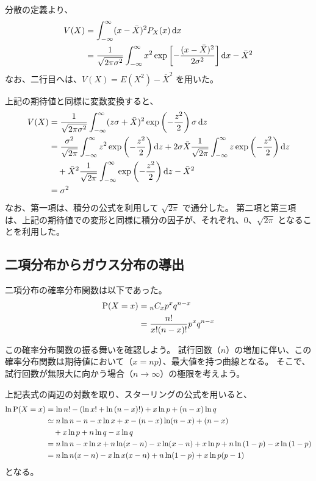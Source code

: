 \documentclass[a4paper,11pt]{ltjsarticle}
\begin{document}
\begin{appendix}
分散の定義より、
\begin{align}
V(X) 
	&= \int_{-\infty}^{\infty} (x - \bar{X})^2 P_X(x) \odif{x} \notag \\
	&= \frac{1}{\sqrt{2 \pi \sigma^2}} \int_{-\infty}^{\infty} x^2 \exp \left[- \frac{(x -\bar{X})^2}{2 \sigma^2} \right] \odif{x} - \bar{X}^2
\end{align}
なお、二行目へは、$V(X)=E(X^2)-\bar{X}^2$ を用いた。

上記の期待値と同様に変数変換すると、
\begin{align}
V(X) 
	&= \frac{1}{\sqrt{2 \pi \sigma^2}}  \int_{-\infty}^{\infty} (z\sigma + \bar{X})^2 \exp \left(- \frac{z^2}{2} \right) \sigma \odif{z} \notag \\
	&= \frac{\sigma^2}{\sqrt{2 \pi}}  \int_{-\infty}^{\infty} z^2 \exp \left(- \frac{z^2}{2} \right) \odif{z} + 2\sigma \bar{X} \frac{1}{\sqrt{2 \pi}} \int_{-\infty}^{\infty} z \exp \left(- \frac{z^2}{2} \right) \odif{z} \notag \\
	&\quad + \bar{X}^2 \frac{1}{\sqrt{2 \pi}} \int_{-\infty}^{\infty} \exp \left(- \frac{z^2}{2} \right) \odif{z} - \bar{X}^2 \notag \\
	&= \sigma^2
\end{align}
なお、第一項は、積分の公式を利用して $\sqrt{2 \pi}$ で通分した。
第二項と第三項は、上記の期待値での変形と同様に積分の因子が、それぞれ、0、$\sqrt{2 \pi}$ となることを利用した。


\subsection{二項分布からガウス分布の導出}
二項分布の確率分布関数は以下であった。
\begin{align}
{\rm P}(X=x) 
	&= {}_nC_x p^x q^{n-x} \notag \\
	&= \dfrac{n!}{x!(n - x)!} p^x q^{n-x} 
\end{align}

この確率分布関数の振る舞いを確認しよう。
試行回数（$n$）の増加に伴い、この確率分布関数は期待値において（$x=np$）、最大値を持つ曲線となる。
そこで、試行回数が無限大に向かう場合（$n \rightarrow \infty $）の極限を考えよう。

上記表式の両辺の対数を取り、スターリングの公式を用いると、
\begin{align*}
\ln {\rm P}(X=x) 
	&= \ln {n!} -(\ln {x!} + \ln {(n - x)!}) + x \ln{p} + (n-x) \ln q  \notag \\
	&\simeq n\ln {n} -n - x\ln {x} + x - (n-x) \ln (n - x) + (n-x) \notag \\
	&\quad + x \ln{p} + n\ln{q} - x\ln{q} \notag \\
	&= n\ln {n} - x\ln {x} + n \ln (x-n) - x \ln (x-n) + x \ln{p} + n\ln{(1-p)} - x\ln{(1-p)} \notag \\
	&= n\ln n(x-n) - x\ln x(x-n) + n\ln (1-p) + x\ln p(p-1)
\end{align*}
となる。


\end{appendix}
\end{document}
